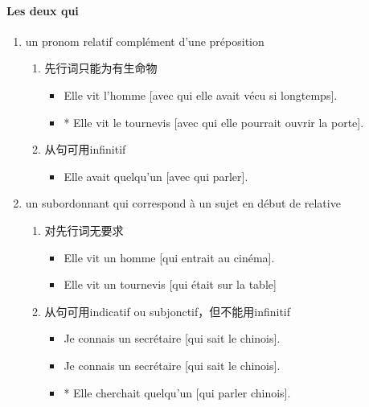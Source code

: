 \documentclass[UTF8]{report}
\begin{document}
\paragraph{Les deux qui}
\begin{enumerate}
    \item un pronom relatif complément d’une préposition 
    \begin{enumerate}
        \item 先行词只能为有生命物
        \begin{itemize}
            \item Elle vit l’homme [avec qui elle avait vécu si longtemps].
            \item * Elle vit le tournevis [avec qui elle pourrait ouvrir la porte].
        \end{itemize}
        \item 从句可用infinitif
        \begin{itemize}
            \item Elle avait quelqu’un [avec qui parler].
        \end{itemize}
    \end{enumerate}
    \item un subordonnant qui correspond à un sujet en début de relative
    \begin{enumerate}
        \item 对先行词无要求
        \begin{itemize}
            \item Elle vit un homme [qui entrait au cinéma].
            \item Elle vit un tournevis [qui était sur la table]
        \end{itemize}
        \item 从句可用indicatif ou subjonctif，但不能用infinitif
        \begin{itemize}
            \item Je connais un secrétaire [qui sait le chinois].
            \item Je connais un secrétaire [qui sait le chinois].
            \item * Elle cherchait quelqu’un [qui parler chinois].
        \end{itemize}
    \end{enumerate}
\end{enumerate}
\end{document}
